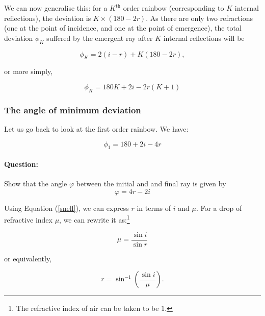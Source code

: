 \begin{refsection}
We can now generalise this: for a $K^\text{th}$ order rainbow (corresponding to $K$ internal reflections), the deviation is $K\times(180 - 2r)$. As there are only two refractions (one at the point of incidence, and one at the point of emergence), the total deviation $\phi_K$ suffered by the emergent ray after $K$ internal reflections will be

\begin{equation*}
    \phi_K = 2(i-r) + K(180-2r),
\end{equation*}

or more simply, 

\begin{equation}
    \phi_K = 180K + 2i - 2r(K+1)
    \label{mindevK}
\end{equation}


\subsubsection*{The angle of minimum deviation}

Let us go back to look at the first order rainbow. We have:

\begin{equation*}
    \phi_1 = 180 + 2 i - 4 r
\end{equation*}

\begin{question}
\paragraph{Question:} Show that the angle $\varphi$ between the initial and and final ray is given by 
\begin{equation}
    \varphi = 4 r - 2 i
\end{equation}
\end{question}


Using Equation (\ref{snell}), we can express $r$ in terms of $i$ and $\mu$. For a drop of refractive index $\mu$, we can rewrite it as:\footnote{The refractive index of air can be taken to be $1$.}

\begin{equation}
    \mu = \frac{\sin{i}}{\sin{r}}
    \label{snellir}
\end{equation}

 or equivalently,
 
 \begin{equation}
     r = \sin^{-1}\left(\frac{\sin{i}}{\mu}\right).
     \label{rasfnofu}
 \end{equation}


\end{refsection}
